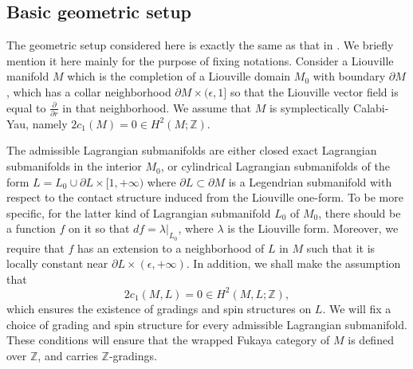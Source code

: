 \documentclass{amsart}
\numberwithin{equation}{section}
\numberwithin{figure}{section}
\begin{document}
\subsection{Basic geometric setup}
	The geometric setup considered here is exactly the same as that in \cite{Gao1}. We briefly mention it here mainly for the purpose of fixing notations. Consider a Liouville manifold $M$ which is the completion of a Liouville domain $M_{0}$ with boundary $\partial M$, which has a collar neighborhood $\partial M \times (\epsilon, 1]$ so that the Liouville vector field is equal to $\frac{\partial}{\partial r}$ in that neighborhood. We assume that $M$ is symplectically Calabi-Yau, namely $2c_{1}(M) = 0 \in H^{2}(M; \mathbb{Z})$. \par
	The admissible Lagrangian submanifolds are either closed exact Lagrangian submanifolds in the interior $M_{0}$, or cylindrical Lagrangian submanifolds of the form $L = L_{0} \cup \partial L \times [1, +\infty)$ where $\partial L \subset \partial M$ is a Legendrian submanifold with respect to the contact structure induced from the Liouville one-form. To be more specific, for the latter kind of Lagrangian submanifold $L_{0}$ of $M_{0}$, there should be a function $f$ on it so that $df = \lambda |_{L_{0}}$, where $\lambda$ is the Liouville form. Moreover, we require that $f$ has an extension to a neighborhood of $L$ in $M$ such that it is locally constant near $\partial L \times (\epsilon, +\infty)$. In addition, we shall make the assumption that
\begin{equation}
2c_{1}(M, L) = 0 \in H^{2}(M, L; \mathbb{Z}),
\end{equation}
which ensures the existence of gradings and spin structures on $L$. We will fix a choice of grading and spin structure for every admissible Lagrangian submanifold. These conditions will ensure that the wrapped Fukaya category of $M$ is defined over $\mathbb{Z}$, and carries $\mathbb{Z}$-gradings. \par
\end{document}
